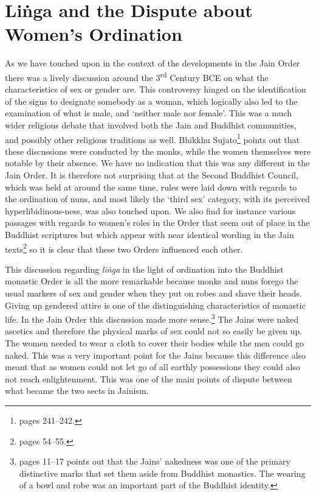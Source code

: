 \section{Liṅga and the Dispute about Women's Ordination}
\label{linga}

As we have touched upon in the context of the developments in the Jain Order there was a lively discussion around the 3\textsuperscript{rd} Century BCE on what the characteristics of sex or gender are. This controversy hinged on the identification of the signs to designate somebody as a woman, which logically also led to the examination of what is male, and `neither male nor female'. This was a much wider religious debate that involved both the Jain and Buddhist communities, and possibly other religious traditions as well. Bhikkhu Sujato\footnote{\cite{sujato2009} pages 241–242.} points out that these discussions were conducted by the monks, while the women themselves were notable by their absence. We have no indication that this was any different in the Jain Order. It is therefore not surprising that at the Second Buddhist Council, which was held at around the same time, rules were laid down with regards to the ordination of nuns, and most likely the `third sex' category, with its perceived hyperlibidinous-ness, was also touched upon. We also find for instance various passages with regards to women's roles in the Order that seem out of place in the Buddhist scriptures but which appear with near identical wording in the Jain texts\footnote{\cite{sujato2009} pages 54–55.} so it is clear that these two Orders influenced each other.

This discussion regarding {\em liṅga} in the light of ordination into the Buddhist monastic Order is all the more remarkable because monks and nuns forego the usual markers of sex and gender when they put on robes and shave their heads. Giving up gendered attire is one of the distinguishing characteristics of monastic life. In the Jain Order this discussion made more sense.\footnote{\cite{maes2016} pages 11–17 points out that the Jains' nakedness was one of the primary distinctive marks that set them aside from Buddhist monastics. The wearing of a bowl and robe was an important part of the Buddhist identity.} The Jains were naked ascetics and therefore the physical marks of sex could not so easily be given up. The women needed to wear a cloth to cover their bodies while the men could go naked. This was a very important point for the Jains because this difference also meant that as women could not let go of all earthly possessions they could also not reach enlightenment. This was one of the main points of dispute between what became the two sects in Jainism.

